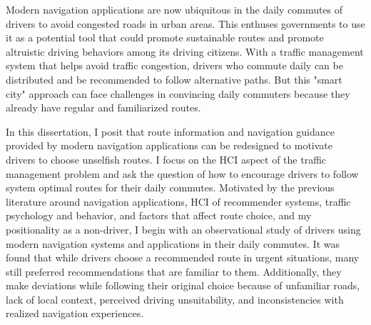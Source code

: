 Modern navigation applications are now ubiquitous in the daily commutes of drivers to avoid congested roads in urban areas. This enthuses governments to use it as a potential tool that could promote sustainable routes and promote altruistic driving behaviors among its driving citizens. With a traffic management system that helps avoid traffic congestion, drivers who commute daily can be distributed and be recommended to follow alternative paths. But this "smart city" approach can face challenges in convincing daily commuters because they already have regular and familiarized routes.

In this dissertation, I posit that route information and navigation guidance provided by modern navigation applications can be redesigned to motivate drivers to choose unselfish routes. I focus on the HCI aspect of the traffic management problem and ask the question of how to encourage drivers to follow system optimal routes for their daily commutes. Motivated by the previous literature around navigation applications, HCI of recommender systems, traffic psychology and behavior, and factors that affect route choice, and my positionality as a non-driver, I begin with an observational study of drivers using modern navigation systems and applications in their daily commutes. It was found that while drivers choose a recommended route in urgent situations, many still preferred recommendations that are familiar to them. Additionally, they make deviations while following their original choice because of unfamiliar roads, lack of local context, perceived driving unsuitability, and inconsistencies with realized navigation experiences. 

